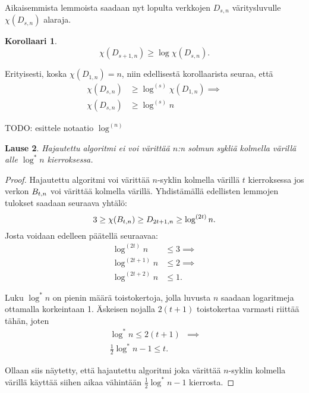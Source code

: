\documentclass[finnish]{tktltiki2}
\newtheorem{lau}{Lause}
\newtheorem{kor}[lau]{Korollaari}
\theoremstyle{definition}
\theoremstyle{remark}
\newcommand{\Dsn}{D_{s,n}}
\newcommand{\Dssn}{D_{s+1,n}}
\begin{document}
Aikaisemmista lemmoista saadaan nyt lopulta verkkojen $\Dsn$ vä\-ri\-tys\-lu\-vul\-le
$\chi(\Dsn)$ alaraja.

\begin{kor}
    \begin{equation*}
        \chi(\Dssn) \geq \log \chi(\Dsn).
    \end{equation*}
\end{kor}

Erityisesti, koska $\chi(D_{1,n}) = n$, niin edellisestä korollaarista seuraa, että
%
\begin{align*}
    \chi(\Dsn) &\geq \log^{(s)} \chi(D_{1,n}) \implies \\
    \chi(\Dsn) &\geq \log^{(s)} n
\end{align*}

TODO: esittele notaatio $\log^{(n)}$

\begin{lau}
    Hajautettu algoritmi ei voi värittää $n$:n solmun sykliä kolmella värillä
    alle $\log^* n$ kierroksessa.
\end{lau}

\begin{proof}
    Hajautettu algoritmi voi värittää $n$-syklin kolmella värillä $t$
    kierroksessa jos verkon $B_{t,n}$ voi värittää kolmella värillä. Yhdistämällä
    edellisten lemmojen tulokset saadaan seuraava yhtälö:
    \begin{equation*}
        3 \geq \chi(B_{t,n}) \geq D_{2t+1, n} \geq \log^{(2t)} n.
    \end{equation*}
    Josta voidaan edelleen päätellä seuraavaa:
    \begin{align*}
        \log^{(2t)}   n &\leq 3 \implies \\
        \log^{(2t+1)} n &\leq 2 \implies \\
        \log^{(2t+2)} n &\leq 1.
    \end{align*}

    Luku $\log^* n$ on pienin määrä toistokertoja, jolla luvusta $n$ saadaan
    logaritmeja ottamalla korkeintaan 1. Äskeisen nojalla $2(t+1)$ toistokertaa
    varmasti riittää tähän, joten
    \begin{align*}
        \log^* n \leq 2(t+1)            & \implies \\
        \frac{1}{2} \log^* n - 1 \leq t. &
    \end{align*}

    Ollaan siis näytetty, että hajautettu algoritmi joka värittää $n$-syklin
    kolmella värillä käyttää siihen aikaa vähintään $\frac{1}{2} \log^* n - 1$
    kierrosta.

\end{proof}
\end{document}

